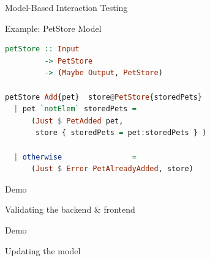 \begin{frame}[fragile]{Model-Based Interaction Testing}
\end{frame}



\begin{frame}[fragile]{Example: PetStore Model}
\begin{lstlisting}[language=Haskell,basicstyle=\ttfamily,keywordstyle=\color{red}]
petStore :: Input
         -> PetStore
         -> (Maybe Output, PetStore)

petStore Add{pet}  store@PetStore{storedPets}
  | pet `notElem` storedPets =
      (Just $ PetAdded pet,
       store { storedPets = pet:storedPets } )

  | otherwise                =
      (Just $ Error PetAlreadyAdded, store)
\end{lstlisting}
\end{frame}

\begin{frame}[fragile]{Demo}
  \begin{center}
    \Huge{Validating the backend \& frontend}
  \end{center}
\end{frame}

\begin{frame}[fragile]{Demo}
  \begin{center}
    \Huge{Updating the model}
  \end{center}
\end{frame}

